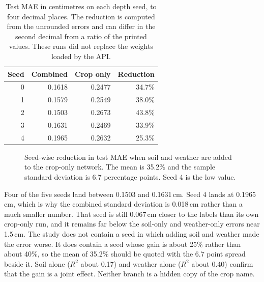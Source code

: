 \begin{table}[H]
\centering
\caption{Test MAE in centimetres on each depth seed, to four decimal places. The reduction is computed from the unrounded errors and can differ in the second decimal from a ratio of the printed values. These runs did not replace the weights loaded by the API.}
\label{tab:depth-by-seed}
\begin{tabular}{rrrr}
\toprule
\textbf{Seed} & \textbf{Combined} & \textbf{Crop only} & \textbf{Reduction} \\
\midrule
0 & 0.1618 & 0.2477 & 34.7\% \\
1 & 0.1579 & 0.2549 & 38.0\% \\
2 & 0.1503 & 0.2673 & 43.8\% \\
3 & 0.1631 & 0.2469 & 33.9\% \\
4 & 0.1965 & 0.2632 & 25.3\% \\
\bottomrule
\end{tabular}
\end{table}

\begin{figure}[H]
\centering
{}
\caption{Seed-wise reduction in test MAE when soil and weather are added to the crop-only network. The mean is 35.2\% and the sample standard deviation is 6.7 percentage points. Seed 4 is the low value.}
\label{fig:reduction}
\end{figure}

Four of the five seeds land between 0.1503 and 0.1631\,cm. Seed 4 lands at 0.1965\,cm, which is why the combined standard deviation is 0.018\,cm rather than a much smaller number. That seed is still 0.067\,cm closer to the labels than its own crop-only run, and it remains far below the soil-only and weather-only errors near 1.5\,cm. The study does not contain a seed in which adding soil and weather made the error worse. It does contain a seed whose gain is about 25\% rather than about 40\%, so the mean of 35.2\% should be quoted with the 6.7 point spread beside it. Soil alone ($R^{2}$ about 0.17) and weather alone ($R^{2}$ about 0.40) confirm that the gain is a joint effect. Neither branch is a hidden copy of the crop name.

